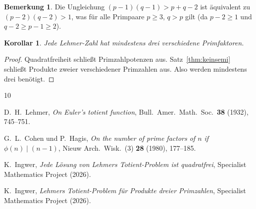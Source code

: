 \documentclass[12pt,a4paper]{amsart}
\newtheorem{corollary}[theorem]{Korollar}
\theoremstyle{definition}
\newtheorem{remark}[theorem]{Bemerkung}
\begin{document}
\begin{remark}
Die Ungleichung $(p-1)(q-1) > p + q - 2$ ist äquivalent zu $(p-2)(q-2) > 1$,
was für alle Primpaare $p \ge 3$, $q > p$ gilt (da $p - 2 \ge 1$ und $q - 2 \ge p - 1 \ge 2$).
\end{remark}

\begin{corollary}
Jede Lehmer-Zahl hat mindestens drei verschiedene Primfaktoren.
\end{corollary}

\begin{proof}
Quadratfreiheit \cite{Ingwer2026qfrei} schließt Primzahlpotenzen aus.
Satz~\ref{thm:keinsemi} schließt Produkte zweier verschiedener Primzahlen aus.
Also werden mindestens drei benötigt.
\end{proof}

\begin{thebibliography}{10}

D.~H.~Lehmer,
\emph{On Euler's totient function},
Bull.\ Amer.\ Math.\ Soc.\ \textbf{38} (1932), 745--751.

G.~L.~Cohen und P.~Hagis,
\emph{On the number of prime factors of $n$ if $\phi(n) \mid (n-1)$},
Nieuw Arch.\ Wisk.\ (3) \textbf{28} (1980), 177--185.

K.~Ingwer,
\emph{Jede Lösung von Lehmers Totient-Problem ist quadratfrei},
Specialist Mathematics Project (2026).

K.~Ingwer,
\emph{Lehmers Totient-Problem für Produkte dreier Primzahlen},
Specialist Mathematics Project (2026).

\end{thebibliography}
\end{document}
